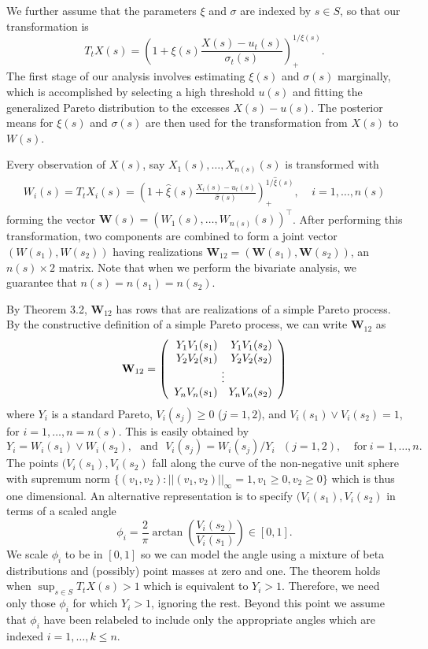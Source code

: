 \documentclass[12pt]{article}
\newcommand{\m}[1]{\mathbf{\bm{#1}}}
\begin{document}
We further assume that the parameters $\xi$ and $\sigma$ are indexed by $s\in S$, so that our transformation is
\[ T_t X(s) = \left(1 + \xi(s) \frac{X(s) - u_t(s)}{\sigma_t(s)}\right)_+^{1/\xi(s)}. \]
The first stage of our analysis involves estimating $\xi(s)$ and $\sigma(s)$ marginally, which is accomplished by selecting a high threshold $u(s)$ and fitting the generalized Pareto distribution to the excesses $X(s)-u(s)$. The posterior means for $\xi(s)$ and $\sigma(s)$ are then used for the transformation from $X(s)$ to $W(s)$.
\bigskip

Every observation of $X(s)$, say $X_1(s),\ldots,X_{n(s)}(s)$ is transformed with
\begin{align}
W_i(s) = T_t X_i(s) = \left(1 + \hat{\xi}(s) \frac{X_i(s) - u_t(s)}{\hat{\sigma}(s)}\right)_+^{1/\hat{\xi}(s)},~~~~~i=1,\ldots,n(s) \label{transform}
\end{align}
forming the vector $\m{W}(s)=(W_1(s),\ldots,W_{n(s)}(s))^\top$. After performing this transformation, two components are combined to form a joint vector $(W(s_1), W(s_2))$ having realizations $\m{W}_{12}=(\m{W}(s_1), \m{W}(s_2))$, an $n(s)\times 2$ matrix. Note that when we perform the bivariate analysis, we guarantee that $n(s)=n(s_1)=n(s_2)$.
\bigskip

By Theorem 3.2, $\m{W}_{12}$ has rows that are realizations of a simple Pareto process. By the constructive definition of a simple Pareto process, we can write $\m{W}_{12}$ as
\[ \m{W}_{12} = \left(\begin{array}{rr} Y_1V_1(s_1) & Y_1V_1(s_2) \\ Y_2V_2(s_1) & Y_2V_2(s_2) \\ \multicolumn{2}{c}{\vdots} \\ Y_nV_n(s_1) & Y_nV_n(s_2) \end{array}\right) \]
where $Y_i$ is a standard Pareto, $V_i(s_j)\geq 0$ ($j=1,2$), and $V_i(s_1) \vee V_i(s_2) = 1$, for $i=1,\ldots,n=n(s)$. This is easily obtained by
\[ Y_i = W_i(s_1) \vee W_i(s_2),~~~\mathrm{and}~~~ V_i(s_j) = W_i(s_j) / Y_i ~~~ (j=1,2),~~~~~\mathrm{for~}i=1,\ldots,n. \]
The points $(V_i(s_1), V_i(s_2)$ fall along the curve of the non-negative unit sphere with supremum norm $\{(v_1, v_2):||(v_1,v_2)||_\infty=1, v_1\geq0,v_2\geq0\}$ which is thus one dimensional. An alternative representation is to specify $(V_i(s_1), V_i(s_2)$ in terms of a scaled angle
\[ \phi_i = \frac{2}{\pi}\arctan\left(\frac{V_i(s_2)}{V_i(s_1)}\right)\in[0,1]. \]
We scale $\phi_i$ to be in $[0,1]$ so we can model the angle using a mixture of beta distributions and (possibly) point masses at zero and one. The theorem holds when $\sup_{s\in S}T_t X(s) > 1$ which is equivalent to $Y_i > 1$. Therefore, we need only those $\phi_i$ for which $Y_i>1$, ignoring the rest. Beyond this point we assume that $\phi_i$ have been relabeled to include only the appropriate angles which are indexed $i=1,\ldots,k\leq n$.
\end{document}
